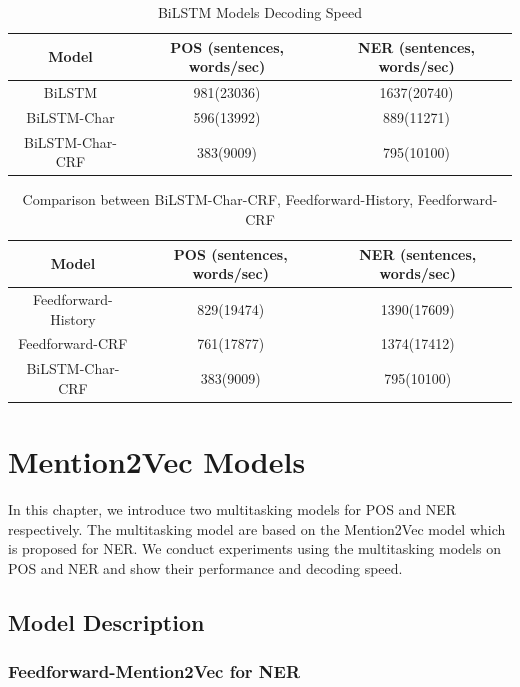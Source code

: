 \documentclass{sfuthesis}
\begin{document}
\begin{table}[]
\centering
\caption{BiLSTM Models Decoding Speed}
\label{table:lstm-table2}
\begin{tabular}{|c|c|c|}
\hline
Model       & POS  (sentences, words/sec)  & NER  (sentences, words/sec)      \\ \hline
BiLSTM             & 981(23036)     & 1637(20740)       \\ \hline
BiLSTM-Char        & 596(13992)  & 889(11271)             \\ \hline
BiLSTM-Char-CRF    & 383(9009)  & 795(10100)         \\ \hline
\end{tabular}
\end{table}

\begin{table}[]
\centering
\caption{Comparison between BiLSTM-Char-CRF, Feedforward-History, Feedforward-CRF}
\label{table:lstm-table3}
\begin{tabular}{|c|c|c|}
\hline
Model       & POS  (sentences, words/sec)  & NER  (sentences, words/sec)      \\ \hline
Feedforward-History            & 829(19474)     & 1390(17609)       \\ \hline
Feedforward-CRF        & 761(17877)  & 1374(17412)             \\ \hline
BiLSTM-Char-CRF    & 383(9009)  & 795(10100)         \\ \hline
\end{tabular}
\end{table}

\chapter{Mention2Vec Models}

In this chapter, we introduce two multitasking models for POS and NER respectively. The multitasking model are based on the Mention2Vec model which is proposed for NER. We conduct experiments using the multitasking models on POS and NER and show their performance and decoding speed. 

\section{Model Description}

\subsection{Feedforward-Mention2Vec for NER}
\end{document}
